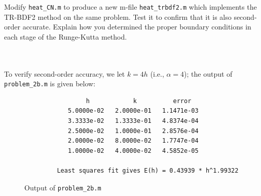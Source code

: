 Modify \texttt{heat\_CN.m} to produce a new m-file \texttt{heat\_trbdf2.m} which implements the TR-BDF2 method on the
same problem. Test it to confirm that it is also second-order accurate. Explain how you determined the proper boundary
conditions in each stage of the Runge-Kutta method.

\begin{solution}\ \\\\
    \hfill\vfill
    \pagebreak
    To verify second-order accuracy, we let $k = 4h$ (i.e., $\alpha = 4$); the output of \texttt{problem\_2b.m} is 
    given below:
    
    \begin{figure}[h]
        \centering
        \begin{verbatim}
                 h            k          error
            5.0000e-02   2.0000e-01   1.1471e-03
            3.3333e-02   1.3333e-01   4.8374e-04
            2.5000e-02   1.0000e-01   2.8576e-04
            2.0000e-02   8.0000e-02   1.7747e-04
            1.0000e-02   4.0000e-02   4.5852e-05
          
         Least squares fit gives E(h) = 0.43939 * h^1.99322
        \end{verbatim}
        \caption{Output of \texttt{problem\_2b.m}}
    \end{figure}


\end{solution}
